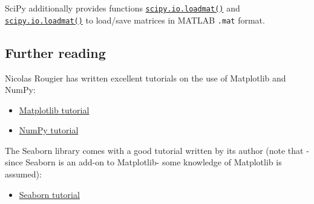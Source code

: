 \documentclass[english,serif,mathserif,xcolor=pdftex,dvipsnames,table]{beamer}
\begin{document}
SciPy additionally provides functions
\href{https://docs.scipy.org/doc/scipy/reference/generated/scipy.io.loadmat.html}{\texttt{scipy.io.loadmat()}}
and
\href{https://docs.scipy.org/doc/scipy/reference/generated/scipy.io.savemat.html}{\texttt{scipy.io.loadmat()}}
to load/save matrices in MATLAB \texttt{.mat} format.

\subsection{Further reading}\label{further-reading}

Nicolas Rougier has written excellent tutorials on the use of Matplotlib
and NumPy:

\begin{itemize}
\tightlist
\item
  \href{https://www.labri.fr/perso/nrougier/teaching/matplotlib/}{Matplotlib
  tutorial}
\item
  \href{http://www.labri.fr/perso/nrougier/teaching/numpy/numpy.html}{NumPy
  tutorial}
\end{itemize}

The Seaborn library comes with a good tutorial written by its author
(note that -since Seaborn is an add-on to Matplotlib- some knowledge of
Matplotlib is assumed):

\begin{itemize}
\tightlist
\item
  \href{http://seaborn.pydata.org/tutorial.html}{Seaborn tutorial}
\end{itemize}

\end{document}

